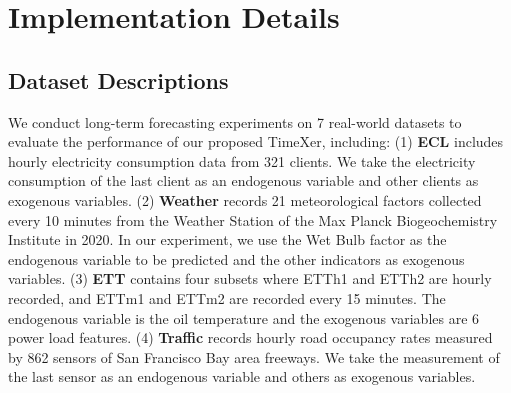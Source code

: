 \documentclass[nohyperref]{article}
\theoremstyle{plain}
\theoremstyle{definition}
\theoremstyle{remark}
\begin{document}




\newpage
\appendix
\onecolumn
\section{Implementation Details}

\subsection{Dataset Descriptions}
We conduct long-term forecasting experiments on 7 real-world datasets to evaluate the performance of our proposed TimeXer, including: (1) \textbf{ECL} \cite{li2019enhancing} includes hourly electricity consumption data from 321 clients. We take the electricity consumption of the last client as an endogenous variable and other clients as exogenous variables. (2) \textbf{Weather} \cite{zhou2021informer} records 21 meteorological factors collected every 10 minutes from the Weather Station of the Max Planck Biogeochemistry Institute in 2020. In our experiment, we use the Wet Bulb factor as the endogenous variable to be predicted and the other indicators as exogenous variables. (3) \textbf{ETT} \cite{zhou2021informer} contains four subsets where ETTh1 and ETTh2 are hourly recorded, and ETTm1 and ETTm2 are recorded every 15 minutes. The endogenous variable is the oil temperature and the exogenous variables are 6 power load features. (4) \textbf{Traffic} \cite{wu2023timesnet} records hourly road occupancy rates measured by 862 sensors of San Francisco Bay area freeways.  We take the measurement of the last sensor as an endogenous variable and others as exogenous variables.
\end{document}
